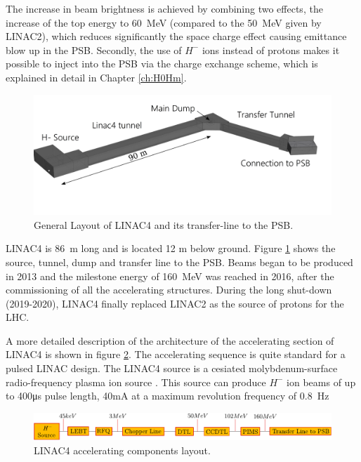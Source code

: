 The increase in beam brightness is achieved by combining two effects, the increase of the top energy to \SIlist[]{60}{\mega \electronvolt} (compared to the \SI[]{50}{\mega \electronvolt} given by LINAC2), which reduces significantly the space charge effect causing emittance blow up in the PSB. Secondly, the use of $H^{-}$ ions instead of protons makes it possible to inject into the PSB via the charge exchange scheme, which is explained in detail in Chapter \ref{ch:H0Hm}.

\begin{figure}[h]
    \centering
    \includegraphics[width=0.70\columnwidth]{Linac4_Layout/linac4_Layout.png}
    \caption{General Layout of LINAC4 and its transfer-line to the PSB. }
    \label{fig:Linac4_layout}
\end{figure}

LINAC4 is \SI[]{86}{\metre} long and is located 12 m below ground. Figure \ref{fig:Linac4_layout} shows the source, tunnel, dump and transfer line to the PSB. Beams began to be produced in 2013 and the milestone energy of \SIlist[]{160}{\mega \electronvolt} was reached in 2016, after the commissioning of all the accelerating structures. During the long shut-down (2019-2020), LINAC4 finally replaced LINAC2 as the source of protons for the LHC. 

A more detailed description of the architecture of the accelerating section of LINAC4 is shown in figure \ref{fig:Linac4_acc}. The accelerating sequence is quite standard for a pulsed LINAC design. The LINAC4 source is a cesiated molybdenum-surface radio-frequency plasma ion source \parencite*[][]{ref:SourceCite}. This source can produce $H^{-}$ ion beams of up to 400\si[]{\micro \second} pulse length, 40\si[]{\milli \ampere} at a maximum revolution frequency of \SI[]{0.8}{\hertz}

\begin{figure}[h]
    \centering
    \includegraphics[width=1.0\columnwidth]{Linac4_AcceleratingPart/Linac4_acc.pdf}
    \caption{LINAC4 accelerating components layout. }
    \label{fig:Linac4_acc}
\end{figure}

